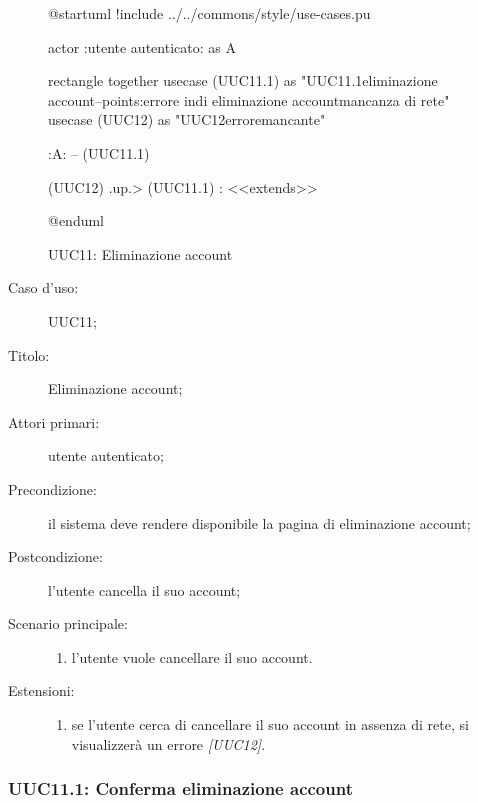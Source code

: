 \documentclass[../../../analisi-dei-requisiti.tex]{subfiles}
\begin{document}
\begin{figure}[H]
  \centering
  \begin{plantuml}
  @startuml
  !include ../../commons/style/use-cases.pu

  actor :utente autenticato: as A

  rectangle {
    together {
      usecase (UUC11.1) as "UUC11.1\nConferma eliminazione account\n--\nExtension points:\nVisualizzazione errore in\ncaso di eliminazione account\nin mancanza di rete"
      usecase (UUC12) as "UUC12\nVisualizzazione errore\nrete mancante"
    }
  }

  :A: -- (UUC11.1)

  (UUC12) .up.> (UUC11.1) : <<extends>>

  @enduml
  \end{plantuml}
  \caption{UUC11: Eliminazione account}%
  \label{fig:UUC11}
\end{figure}

\begin{description}
  \item[Caso d’uso:] UUC11;
  \item[Titolo:] Eliminazione account;
  \item[Attori primari:] utente autenticato;
  \item[Precondizione:] il sistema deve rendere disponibile la pagina di eliminazione account;
  \item[Postcondizione:] l'utente cancella il suo account;
  \item[Scenario principale:]
        \begin{enumerate}
          \item l'utente vuole cancellare il suo account.
        \end{enumerate}
        \item[Estensioni:]
        \begin{enumerate}
          \item se l'utente cerca di cancellare il suo account in assenza di rete, si visualizzerà un errore \emph{[UUC12]}.
        \end{enumerate}
\end{description}

\subsubsection{UUC11.1: Conferma eliminazione account}%
\label{subs:UUC11.1}
\end{document}
